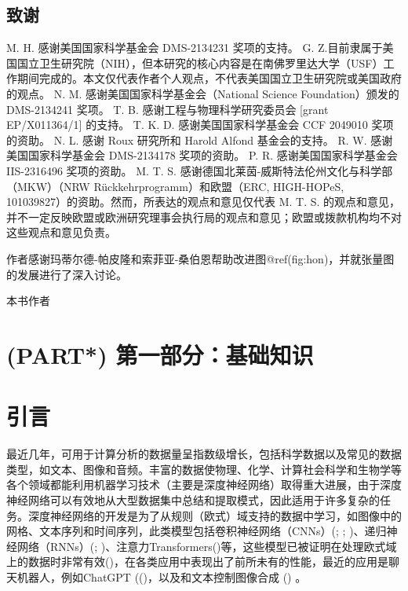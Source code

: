 \documentclass[
  12pt,
]{krantz}
\begin{document}
\subsection*{致谢}\label{ux81f4ux8c22}

M. H. 感谢美国国家科学基金会 DMS-2134231 奖项的支持。 G.
Z.目前隶属于美国国立卫生研究院（NIH），但本研究的核心内容是在南佛罗里达大学（USF）工作期间完成的。本文仅代表作者个人观点，不代表美国国立卫生研究院或美国政府的观点。
N. M. 感谢美国国家科学基金会（National Science Foundation）颁发的
DMS-2134241 奖项。 T. B. 感谢工程与物理科学研究委员会 {[}grant
EP/X011364/1{]} 的支持。 T. K. D. 感谢美国国家科学基金会 CCF 2049010
奖项的资助。 N. L. 感谢 Roux 研究所和 Harold Alfond 基金会的支持。 R. W.
感谢美国国家科学基金会 DMS-2134178 奖项的资助。 P. R.
感谢美国国家科学基金会 IIS-2316496 奖项的资助。 M. T. S.
感谢德国北莱茵-威斯特法伦州文化与科学部（MKW）（NRW
Rückkehrprogramm）和欧盟（ERC, HIGH-HOPeS,
101039827）的资助。然而，所表达的观点和意见仅代表 M. T. S.
的观点和意见，并不一定反映欧盟或欧洲研究理事会执行局的观点和意见；欧盟或拨款机构均不对这些观点和意见负责。

作者感谢玛蒂尔德-帕皮隆和索菲亚-桑伯恩帮助改进图@ref(fig:hon)，并就张量图的发展进行了深入讨论。


本书作者 

\mainmatter

\section*{(PART*)
第一部分：基础知识}\label{part-ux7b2cux4e00ux90e8ux5206ux57faux7840ux77e5ux8bc6}

\section{引言}\label{ux5f15ux8a00}

最近几年，可用于计算分析的数据量呈指数级增长，包括科学数据以及常见的数据类型，如文本、图像和音频。丰富的数据使物理、化学、计算社会科学和生物学等各个领域都能利用机器学习技术（主要是深度神经网络）取得重大进展，由于深度神经网络可以有效地从大型数据集中总结和提取模式，因此适用于许多复杂的任务。深度神经网络的开发是为了从规则（欧式）域支持的数据中学习，如图像中的网格、文本序列和时间序列，此类模型包括卷积神经网络（CNNs）(; ; )、递归神经网络（RNNs）(; )、注意力Transformers()等，这些模型已被证明在处理欧式域上的数据时非常有效()，在各类应用中表现出了前所未有的性能，最近的应用是聊天机器人，例如ChatGPT
(()，以及和文本控制图像合成
() 。
\end{document}
